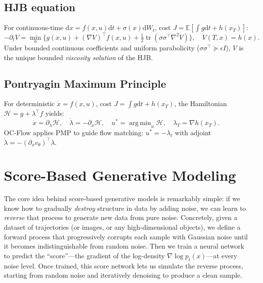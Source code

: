 \documentclass[11pt,letterpaper]{article}
\theoremstyle{plain}
\theoremstyle{definition}
\theoremstyle{remark}
\newcommand{\E}{\mathbb{E}}
\newcommand{\dd}{\mathrm{d}}
\newcommand{\tr}{\operatorname{tr}}
\newcommand{\grad}{\nabla}
\DeclareMathOperator*{\argmin}{arg\,min}
\begin{document}
\begin{advancedmath}
\subsection{HJB equation}

For continuous-time $\dd x=f(x,u)\dd t+\sigma(x)\dd W_t$, cost
$J=\E[\int g\dd t+h(x_T)]$:
\begin{equation}
  -\partial_tV=\min_u\{g(x,u)+(\grad V)^\top f(x,u)
    +\tfrac{1}{2}\tr(\sigma\sigma^\top\nabla^2V)\},\quad V(T,x)=h(x).
  \label{eq:hjb}
\end{equation}
Under bounded continuous coefficients and uniform parabolicity
($\sigma\sigma^\top\succeq\epsilon I$), $V$ is the unique bounded
\emph{viscosity solution} of the HJB.

\subsection{Pontryagin Maximum Principle}\label{sec:pmp}

For deterministic $\dot x=f(x,u)$, cost $J=\int g\dd t+h(x_T)$, the
Hamiltonian $\mathcal{H}=g+\lambda^\top f$ yields:
\begin{equation}
  \dot x=\partial_\lambda\mathcal{H},\quad
  \dot\lambda=-\partial_x\mathcal{H},\quad
  u^*=\argmin_u\mathcal{H},\quad
  \lambda_T=\grad h(x_T).
  \label{eq:pmp}
\end{equation}
OC-Flow \citep{ocflow} applies PMP to guide flow matching:
$u^*=-\lambda_t$ with adjoint
$\dot\lambda=-(\partial_xv_\theta)^\top\lambda$.
\end{advancedmath}

\section{Score-Based Generative Modeling}\label{sec:score}

The core idea behind score-based generative models is remarkably
simple: if we know how to gradually \emph{destroy} structure in data
by adding noise, we can learn to \emph{reverse} that process to
generate new data from pure noise.  Concretely, given a dataset of
trajectories (or images, or any high-dimensional objects), we define a
forward process that progressively corrupts each sample with Gaussian
noise until it becomes indistinguishable from random noise.  Then we
train a neural network to predict the ``score''---the gradient of the
log-density $\grad\log p_t(x)$---at every noise level.  Once trained,
this score network lets us simulate the reverse process, starting from
random noise and iteratively denoising to produce a clean sample.
\end{document}
